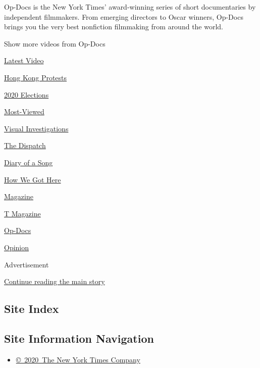 Op-Docs is the New York Times' award-winning series of short
documentaries by independent filmmakers. From emerging directors to
Oscar winners, Op-Docs brings you the very best nonfiction filmmaking
from around the world.

Show more videos from Op-Docs

\href{/video}{}

\href{/video/latest-video}{Latest Video}

\href{/video/hk-protest}{Hong Kong Protests}

\href{/video/2020-Elections}{2020 Elections}

\href{/video/Most-Viewed}{Most-Viewed}

\href{/video/investigations}{Visual Investigations}

\href{/video/on-the-ground}{The Dispatch}

\href{/video/diaryofasong}{Diary of a Song}

\href{/video/how-we-got-here}{How We Got Here}

\href{/video/magazine}{Magazine}

\href{/video/t-magazine}{T Magazine}

\href{/video/op-docs}{Op-Docs}

\href{/video/opinion}{Opinion}

Advertisement

\protect\hyperlink{after-bottom}{Continue reading the main story}

\hypertarget{site-index}{%
\subsection{Site Index}\label{site-index}}

\hypertarget{site-information-navigation}{%
\subsection{Site Information
Navigation}\label{site-information-navigation}}

\begin{itemize}
\tightlist
\item
  \href{https://help.nytimes3xbfgragh.onion/hc/en-us/articles/115014792127-Copyright-notice}{©~2020~The
  New York Times Company}
\end{itemize}

